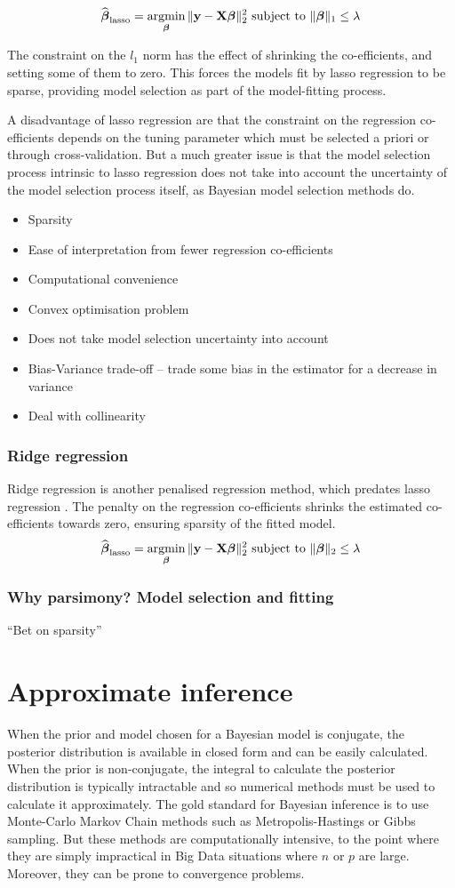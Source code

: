 \documentclass{amsart}[12pt]
\begin{document}
$$
\widehat{\vbeta}_{\text{lasso}} = \argmin_\vbeta \|\vy - \mX \vbeta\|_2^2 \text{ subject to } \|\vbeta\|_1 \leq \lambda
$$

The constraint on the $l_1$ norm has the effect of shrinking the co-efficients, and setting some of them to
zero. This forces the models fit by lasso regression to be sparse, providing model selection as part of the
model-fitting process.

A disadvantage of lasso regression are that the constraint on the regression co-efficients depends on the
tuning parameter which must be selected a priori or through cross-validation. But a much greater issue is that
the model selection process intrinsic to lasso regression does not take into account the uncertainty of the
model selection process itself, as Bayesian model selection methods do.

\begin{itemize}
\item Sparsity
\item Ease of interpretation from fewer regression co-efficients
\item Computational convenience
\item Convex optimisation problem
\item Does not take model selection uncertainty into account
\item Bias-Variance trade-off -- trade some bias in the estimator for a decrease in variance
\item Deal with collinearity
\end{itemize}

\subsubsection{Ridge regression}
Ridge regression is another penalised regression method, which predates lasso regression
\cite{Hoerl2017}. The penalty on the regression co-efficients shrinks the estimated co-efficients towards
zero, ensuring sparsity of the fitted model.
$$
\widehat{\vbeta}_{\text{lasso}} = \argmin_\vbeta \|\vy - \mX \vbeta\|_2^2 \text{ subject to } \|\vbeta\|_2 \leq \lambda
$$
\subsubsection{Why parsimony? Model selection and fitting}
``Bet on sparsity''
\citep{Hastie2015}

\section{Approximate inference}
When the prior and model chosen for a Bayesian model is conjugate, the posterior distribution is available in
closed form and can be easily calculated.
When the prior is non-conjugate, the integral to calculate the posterior distribution is typically intractable
and so numerical methods must be used to calculate it approximately.
The gold standard for Bayesian inference is to use Monte-Carlo Markov Chain methods such as Metropolis-Hastings
or Gibbs sampling. But these methods are computationally intensive, to the point where they are simply
impractical in Big Data situations where $n$ or $p$ are large. Moreover, they can be prone to convergence 
problems.
\end{document}
